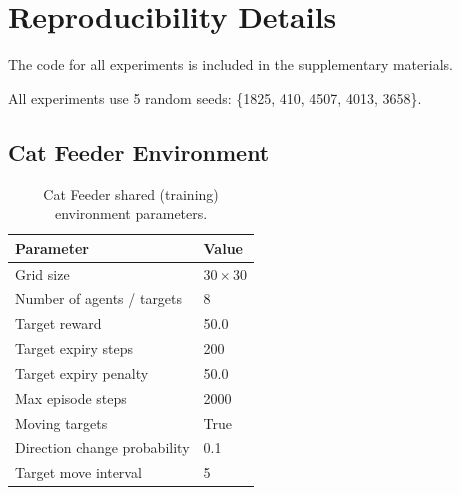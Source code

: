 \section{Reproducibility Details}
\label{sec:reprod-details}

The code for all experiments is included in the supplementary materials.

All experiments use 5 random seeds: \{1825, 410, 4507, 4013, 3658\}.

\subsection{Cat Feeder Environment}

\begin{table}[h]
\centering
\begin{tabular}{ll}
\toprule
Parameter & Value \\
\midrule
Grid size & $30 \times 30$ \\
Number of agents / targets & 8 \\
Target reward & 50.0 \\
Target expiry steps & 200 \\
Target expiry penalty & 50.0 \\
Max episode steps & 2000 \\
Moving targets & True \\
Direction change probability & 0.1 \\
Target move interval & 5 \\
\bottomrule
\end{tabular}
\caption{Cat Feeder shared (training) environment parameters.}
\end{table}

